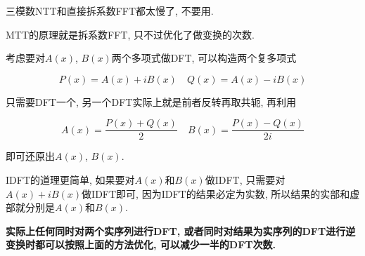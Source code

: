 三模数NTT和直接拆系数FFT都太慢了, 不要用.

MTT的原理就是拆系数FFT, 只不过优化了做变换的次数.

考虑要对$A(x)$, $B(x)$两个多项式做DFT, 可以构造两个复多项式

$$ P(x) = A(x) + iB(x) \quad Q(x) = A(x) - iB(x) $$

只需要DFT一个, 另一个DFT实际上就是前者反转再取共轭, 再利用

$$ A(x) = \frac {P(x) + Q(x)} 2 \quad B(x) = \frac {P(x) - Q(x)} {2i} $$

即可还原出$A(x)$, $B(x)$.

IDFT的道理更简单, 如果要对$A(x)$和$B(x)$做IDFT, 只需要对$A(x) + i B(x)$做IDFT即可, 因为IDFT的结果必定为实数, 所以结果的实部和虚部就分别是$A(x)$和$B(x)$.

\textbf{实际上任何同时对两个实序列进行DFT, 或者同时对结果为实序列的DFT进行逆变换时都可以按照上面的方法优化, 可以减少一半的DFT次数.}

\inputminted{cpp}{../src/math/MTT.cpp}